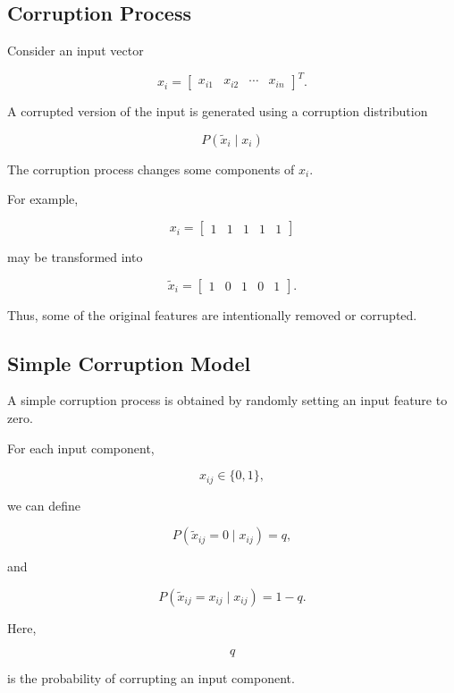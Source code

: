 \documentclass{article}
\begin{document}
\subsection{Corruption Process}

Consider an input vector

\[
x_i=
\begin{bmatrix}
	x_{i1} & x_{i2} & \cdots & x_{in}
\end{bmatrix}^{T}.
\]

A corrupted version of the input is generated using a corruption
distribution

\[
\boxed{
	P(\widetilde{x}_i\mid x_i)
}
\]

The corruption process changes some components of \(x_i\).

For example,

\[
x_i=
\begin{bmatrix}
	1&1&1&1&1
\end{bmatrix}
\]

may be transformed into

\[
\widetilde{x}_i=
\begin{bmatrix}
	1&0&1&0&1
\end{bmatrix}.
\]

Thus, some of the original features are intentionally removed or
corrupted.

\subsection{Simple Corruption Model}

A simple corruption process is obtained by randomly setting an input
feature to zero.

For each input component,

\[
x_{ij}\in\{0,1\},
\]

we can define

\[
P(\widetilde{x}_{ij}=0\mid x_{ij})
=q,
\]

and

\[
P(\widetilde{x}_{ij}=x_{ij}\mid x_{ij})
=1-q.
\]

Here,

\[
q
\]

is the probability of corrupting an input component.
\end{document}
